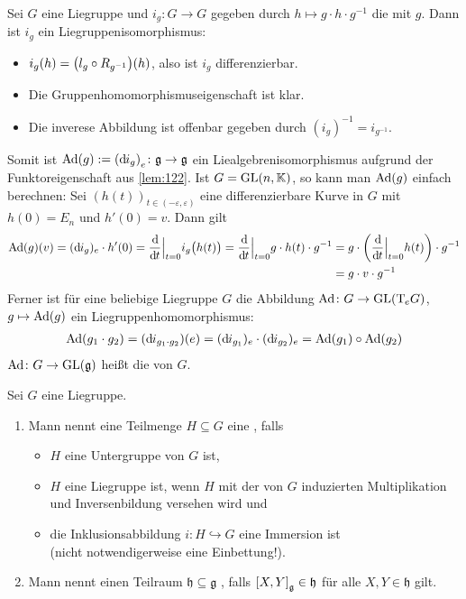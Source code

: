 \begin{beispiel*}[{name=[Konjugation und adjungierte Darstellung]}]
	Sei $G$ eine Liegruppe und $i_g \colon G \to G$ gegeben durch $h \mapsto g \cdot h \cdot g^{-1}$ die  mit $g$.
	Dann ist $i_g$ ein Liegruppenisomorphismus:
	\begin{itemize}[itemsep=0pt]
		\item $i_g(h) = \enbrace*{l_g \circ R_{g^{-1}}}(h)$, also ist $i_g$ differenzierbar.
		\item Die Gruppenhomomorphismuseigenschaft ist klar. 
		\item Die inverese Abbildung ist offenbar gegeben durch $(i_g)^{-1}= i_{g^{-1}}$.
	\end{itemize}
	Somit ist $\Ad(g) := \enbrace*{\mathd i_g}_e \colon \mathfrak{g} \to \mathfrak{g}$ ein Liealgebrenisomorphismus aufgrund der Funktoreigenschaft aus \autoref{lem:122}.	
	Ist $G = \GL(n,\mathbb{K})$, so kann man $\Ad(g)$ einfach berechnen:
	Sei $(h(t))_{t \in (-\varepsilon,\varepsilon)}$ eine differenzierbare Kurve in $G$ mit $h(0)= E_n$ und $h'(0)=v$.
	Dann gilt
	\begin{align}
		\Ad(g)(v)= (\mathd i_g)_e \cdot h'(0) = \diffd{}{t}\Big|_{t=0} i_g \enbrace[\big]{h(t)} = \diffd{}{t}\Big|_{t=0} g \cdot h(t) \cdot g^{-1}
		&= g \cdot \enbrace*{\diffd{}{t}\Big|_{t=0} h(t)} \cdot g^{-1}\\
		&= g \cdot v \cdot g^{-1}
	\end{align}
	Ferner ist für eine beliebige Liegruppe $G$ die Abbildung $\Ad \colon G \to \GL\enbrace*{\Tmap_e G}$, $g \mapsto \Ad(g)$ ein Liegruppenhomomorphismus:
	\begin{align}
		\Ad(g_1 \cdot g_2) = (\mathd i_{g_1 \cdot g_2})(e) = (\mathd i_{g_1})_e \cdot (\mathd i_{g_2})_e = \Ad(g_1) \circ \Ad(g_2)
	\end{align}
	$\Ad \colon G \to \GL(\mathfrak{g})$ heißt die  von $G$.
\end{beispiel*}

\begin{definition}[{name=[{Lieuntergruppe und Lieunteralgebra}]}]
	Sei $G$ eine Liegruppe.
	\begin{enumerate}[1)]
		\item Mann nennt eine Teilmenge $H \subseteq G$ eine , falls 
		\begin{itemize}
			\item $H$ eine Untergruppe von $G$ ist,
			\item $H$ eine Liegruppe ist, wenn $H$ mit der von $G$ induzierten Multiplikation und Inversenbildung versehen wird und
			\item die Inklusionsabbildung $i \colon H \hookrightarrow G$ eine Immersion ist \\ 
			(nicht notwendigerweise eine Einbettung!).
		\end{itemize}
		\item Mann nennt einen Teilraum $\mathfrak{h} \subseteq \mathfrak{g}$ , falls $\benbrace*{X,Y}_\mathfrak{g} \in \mathfrak{h}$ für alle $X,Y \in \mathfrak{h}$ gilt.
	\end{enumerate}
\end{definition}

